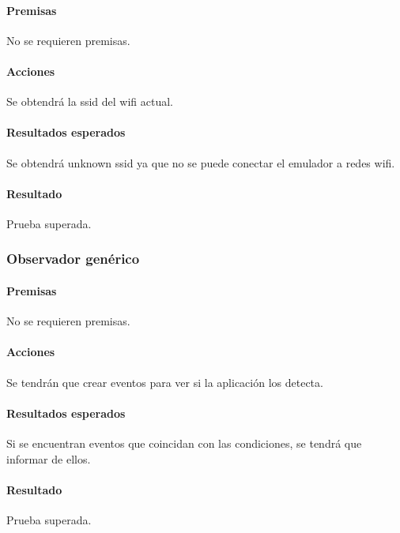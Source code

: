 \paragraph{Premisas}
No se requieren premisas.

\paragraph{Acciones}
Se obtendrá la ssid del wifi actual.

\paragraph{Resultados esperados}
Se obtendrá unknown ssid ya que no se puede conectar el emulador a redes wifi.

\paragraph{Resultado}
Prueba superada.

\subsubsection{Observador genérico}

\paragraph{Premisas}
No se requieren premisas.

\paragraph{Acciones}
Se tendrán que crear eventos para ver si la aplicación los detecta.

\paragraph{Resultados esperados}
Si se encuentran eventos que coincidan con las condiciones, se tendrá que informar de ellos.

\paragraph{Resultado}
Prueba superada.